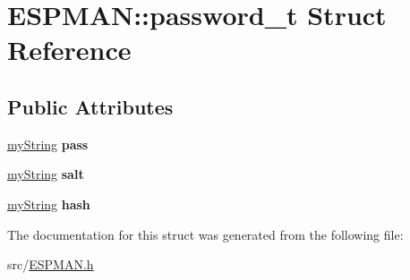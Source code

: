 \hypertarget{struct_e_s_p_m_a_n_1_1password__t}{}\section{E\+S\+P\+M\+AN\+:\+:password\+\_\+t Struct Reference}
\label{struct_e_s_p_m_a_n_1_1password__t}
\subsection*{Public Attributes}
\begin{DoxyCompactItemize}
\item 
\mbox{\label{struct_e_s_p_m_a_n_1_1password__t_aa72bffbde591a99bf33ffdcd5cf14d28}} 
\hyperlink{class_e_s_p_m_a_n_1_1my_string}{my\+String} {\bfseries pass}
\item 
\mbox{\label{struct_e_s_p_m_a_n_1_1password__t_a313d3a4c2f6fb251d5e2041211150d75}} 
\hyperlink{class_e_s_p_m_a_n_1_1my_string}{my\+String} {\bfseries salt}
\item 
\mbox{\label{struct_e_s_p_m_a_n_1_1password__t_a08bdd3806d53dadfd6f4e672b73892c9}} 
\hyperlink{class_e_s_p_m_a_n_1_1my_string}{my\+String} {\bfseries hash}
\end{DoxyCompactItemize}


The documentation for this struct was generated from the following file\+:\begin{DoxyCompactItemize}
\item 
src/\hyperlink{_e_s_p_m_a_n_8h}{E\+S\+P\+M\+A\+N.\+h}\end{DoxyCompactItemize}
